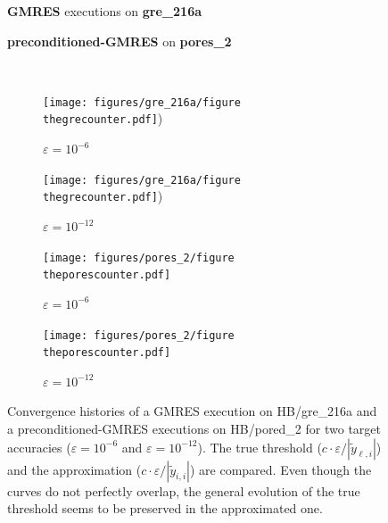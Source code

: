\documentclass[twoside]{article}
\newcounter{fig}\setcounter{fig}{0}
\begin{document}
  \begin{figure}[H]
    \centering
    
    \begin{minipage}[b]{0.45\linewidth}
      \centering
      \textbf{GMRES} executions on \textbf{gre_216a} 
    \end{minipage}
    \quad
    \begin{minipage}{0.45\linewidth}
      \centering
      \textbf{preconditioned-GMRES} on \textbf{pores_2}
    \end{minipage}\\


    \begin{minipage}[b]{0.48\linewidth}
      
      \begin{subfigure}[t]{\linewidth}
        \centering
        \texttt{[image: figures/gre\_216a/figure\\thegrecounter.pdf]})
        \caption{$\varepsilon = 10^{-6}$}\label{fig:gre_216a_conv_hist_threshold_evaluation_0}	
      \end{subfigure}
      \quad
      \begin{subfigure}[t]{\linewidth}
        \centering
        \texttt{[image: figures/gre\_216a/figure\\thegrecounter.pdf]})
        \caption{$\varepsilon = 10^{-12}$}\label{fig:gre_216a_conv_hist_threshold_evaluation_1}	
      \end{subfigure}
    \end{minipage}
    \quad
    \begin{minipage}[b]{0.48\linewidth}
      
      \begin{subfigure}[t]{\linewidth}
        \centering
        \texttt{[image: figures/pores\_2/figure\\theporescounter.pdf]}
        \caption{$\varepsilon = 10^{-6}$}\label{fig:pores_2_conv_hist_threshold_evaluation_0}	
      \end{subfigure}
      \quad
      \begin{subfigure}[t]{\linewidth}
        \centering
        \texttt{[image: figures/pores\_2/figure\\theporescounter.pdf]}
        \caption{$\varepsilon = 10^{-12}$}\label{fig:pores_2_conv_hist_threshold_evaluation_1}	
      \end{subfigure}

    \end{minipage}
    \caption{Convergence histories of a GMRES execution on HB/gre_216a and a preconditioned-GMRES executions on HB/pored_2 for two target accuracies ($\varepsilon = 10^{-6}$ and $\varepsilon = 10^{-12}$). The true threshold ($c \cdot \varepsilon / |\widetilde{y}_{\ell, i}|$) and the approximation ($c \cdot \varepsilon / |\widetilde{y}_{i, i}|$) are compared. Even though the curves do not perfectly overlap, the general evolution of the true threshold seems to be preserved in the approximated one.}\label{fig:conv_hist_threshold_evaluation}
  \end{figure}
\end{document}
